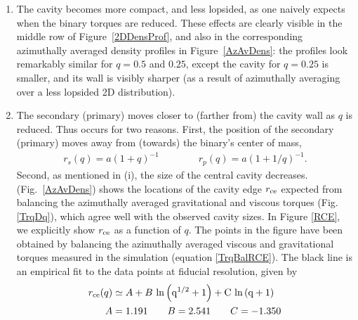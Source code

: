 \begin{enumerate}

\item The cavity becomes more compact, and less lopsided, as one
  naively expects when the binary torques are reduced. These effects
  are clearly visible in the middle row of Figure~\ref{2DDensProf},
  and also in the corresponding azimuthally averaged density profiles
  in Figure~\ref{AzAvDens}: the profiles look remarkably similar for
  $q=0.5$ and $0.25$, except the cavity for $q=0.25$ is smaller, and its
  wall is visibly sharper (as a result of azimuthally averaging over a
  less lopsided 2D distribution).

\item The secondary (primary) moves closer to (farther from) the cavity
  wall as $q$ is reduced. 
  Thus occurs for two reasons. First, the position of the secondary (primary) moves
  away from (towards) the binary's center of mass,
  \begin{align}
  r_s(q)= a(1+q)^{-1} \qquad \qquad  r_p(q) = a(1+1/q)^{-1}.
  \end{align}
  Second, as mentioned in (i), the size of the central cavity decreases. 
  (Fig.~\ref{AzAvDens}) shows the locations of
  the cavity edge $r_{\rm ce}$ expected from balancing the azimuthally
  averaged gravitational and viscous torques (Fig. \ref{TrqDq}), which
  agree well with the observed cavity sizes. In Figure
  \ref{RCE}, we explicitly show $r_{\rm ce}$ as a function of $q$.  The
  points in the figure have been obtained by balancing the azimuthally
  averaged viscous and gravitational torques measured in the simulation
  (equation \ref{TrqBalRCE}).  The black line is an empirical fit to the
  data points at fiducial resolution, given by
  \begin{align}
  r_{\rm ce}(q) &\simeq A + B \ \rm{ln} \left( q^{1/2} + 1\right) + C \ \mbox{ln} \left( q + 1\right)    \nonumber  \\ 
  A &=1.191 \qquad
  B =2.541 \qquad
  C =-1.350
  \label{EmpFitrce}
  \end{align}
  

\end{enumerate}
